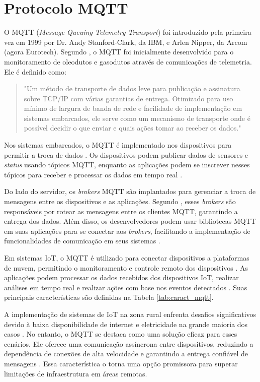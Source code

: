\section{Protocolo MQTT}

O MQTT (\textit{Message Queuing Telemetry Transport}) foi introduzido pela primeira vez em 1999 por Dr. Andy Stanford-Clark, da IBM, e Arlen Nipper, da Arcom (agora Eurotech). Segundo \textcite{Andy_mqtt2004}, o MQTT foi inicialmente desenvolvido para o monitoramento de oleodutos e gasodutos através de comunicações de telemetria. Ele é definido como:

\begin{quote}
"Um método de transporte de dados leve para publicação e assinatura sobre TCP/IP com várias garantias de entrega. Otimizado para uso mínimo de largura de banda de rede e facilidade de implementação em sistemas embarcados, ele serve como um mecanismo de transporte onde é possível decidir o que enviar e quais ações tomar ao receber os dados." \parencite{Andy_mqtt2004}
\end{quote}

Nos sistemas embarcados, o MQTT é implementado nos dispositivos para permitir a troca de dados \parencite{Andy_mqtt2004}. Os dispositivos podem publicar dados de sensores e \textit{status} usando tópicos MQTT, enquanto as aplicações podem se inscrever nesses tópicos para receber e processar os dados em tempo real \parencite{Yassein_mqtt2017}.

Do lado do servidor, os \textit{brokers} MQTT são implantados para gerenciar a troca de mensagens entre os dispositivos e as aplicações. Segundo \textcite{Yassein_mqtt2017}, esses \textit{brokers} são responsáveis por rotear as mensagens entre os clientes MQTT, garantindo a entrega dos dados. Além disso, os desenvolvedores podem usar bibliotecas MQTT em suas aplicações para se conectar aos \textit{brokers}, facilitando a implementação de funcionalidades de comunicação em seus sistemas \parencite{MQTT_org}.

Em sistemas IoT, o MQTT é utilizado para conectar dispositivos a plataformas de nuvem, permitindo o monitoramento e controle remoto dos dispositivos \parencite{junior2022data}. As aplicações podem processar os dados recebidos dos dispositivos IoT, realizar análises em tempo real e realizar ações com base nos eventos detectados \parencite{ferrandez2018precision,hsu2020creative}. Suas principais características são definidas na Tabela \ref{tab:caract_mqtt}.

A implementação de sistemas de IoT na zona rural enfrenta desafios significativos devido à baixa disponibilidade de internet e eletricidade na grande maioria dos casos \parencite{rijswijk2021digital}. No entanto, o MQTT se destaca como uma solução eficaz para esses cenários. Ele oferece uma comunicação assíncrona entre dispositivos, reduzindo a dependência de conexões de alta velocidade e garantindo a entrega confiável de mensagens \parencite{Andy_mqtt2004, Yassein_mqtt2017}. Essa característica o torna uma opção promissora para superar limitações de infraestrutura em áreas remotas. 

